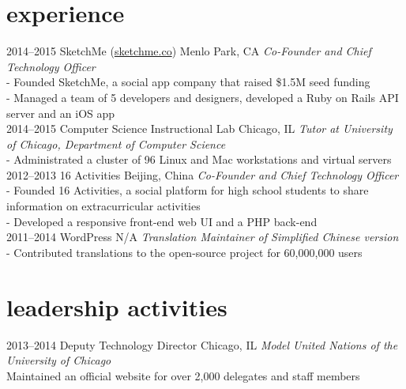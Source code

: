 \section{experience}

\begin{entrylist}
\entry
{2014--2015}
{SketchMe \quad\normalfont (\underline{sketchme.co})}
{Menlo Park, CA}
{\emph{Co-Founder and Chief Technology Officer} \\
- Founded SketchMe, a social app company that raised \$1.5M seed funding \\
- Managed a team of 5 developers and designers, developed a Ruby on Rails API server and an iOS app \\}
\entry
{2014--2015}
{Computer Science Instructional Lab}
{Chicago, IL}
{\emph{Tutor at University of Chicago, Department of Computer Science} \\
- Administrated a cluster of 96 Linux and Mac workstations and virtual servers\\}
\entry
{2012--2013}
{16 Activities}
{Beijing, China}
{\emph{Co-Founder and Chief Technology Officer} \\
- Founded 16 Activities, a social platform for high school students to share information on extracurricular activities \\
- Developed a responsive front-end web UI and a PHP back-end \\}
\entry
{2011--2014}
{WordPress}
{N/A}
{\emph{Translation Maintainer of Simplified Chinese version} \\
-   Contributed translations to the open-source project for 60,000,000 users \\}
\end{entrylist}

\section{leadership activities}

\begin{entrylist}
\entry
{2013--2014}
{Deputy Technology Director}
{Chicago, IL}
{\emph{Model United Nations of the University of Chicago} \\
Maintained an official website for over 2,000 delegates and staff members \\}
\end{entrylist}

